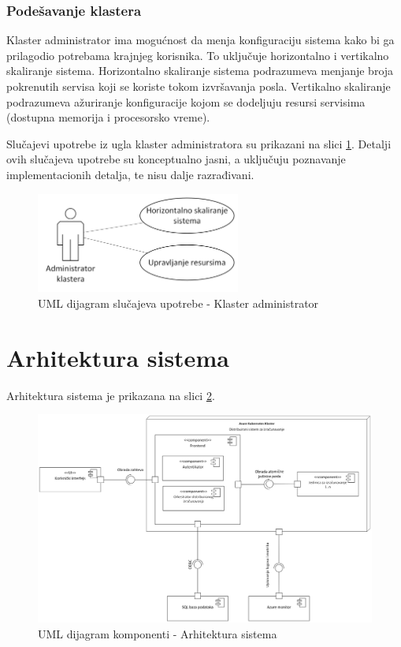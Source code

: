 \documentclass[12pt,oneside]{memoir}
\begin{document}
\subsubsection{Podešavanje klastera}
Klaster administrator ima mogućnost da menja konfiguraciju sistema kako bi ga prilagodio potrebama krajnjeg korisnika. To uključuje horizontalno i vertikalno skaliranje sistema. Horizontalno skaliranje sistema podrazumeva menjanje broja pokrenutih servisa koji se koriste tokom izvršavanja posla. Vertikalno skaliranje podrazumeva ažuriranje konfiguracije kojom se dodeljuju resursi servisima (dostupna memorija i procesorsko vreme).

Slučajevi upotrebe iz ugla klaster administratora su prikazani na slici \ref{fig:slucajupotrebe_admin_klastera}. Detalji ovih slučajeva upotrebe su konceptualno jasni, a uključuju poznavanje implementacionih detalja, te nisu dalje razrađivani.

\begin{figure}[!ht]
  \centering
  \includegraphics[width=0.6\textwidth]{./images/dijagram_slucajeva_upotrebe_administrator_klastera.png}
  \caption{UML dijagram slučajeva upotrebe - Klaster administrator}
  \label{fig:slucajupotrebe_admin_klastera}
\end{figure}

\section{Arhitektura sistema}

Arhitektura sistema je prikazana na slici \ref{fig:arhitektura}.

\begin{figure}[!ht]
  \centering
  \includegraphics[width=1.0\textwidth]{./images/arhitektura_sistema_dijagram_komponenti.png}
  \caption{UML dijagram komponenti - Arhitektura sistema}
  \label{fig:arhitektura}
\end{figure}
\end{document}
